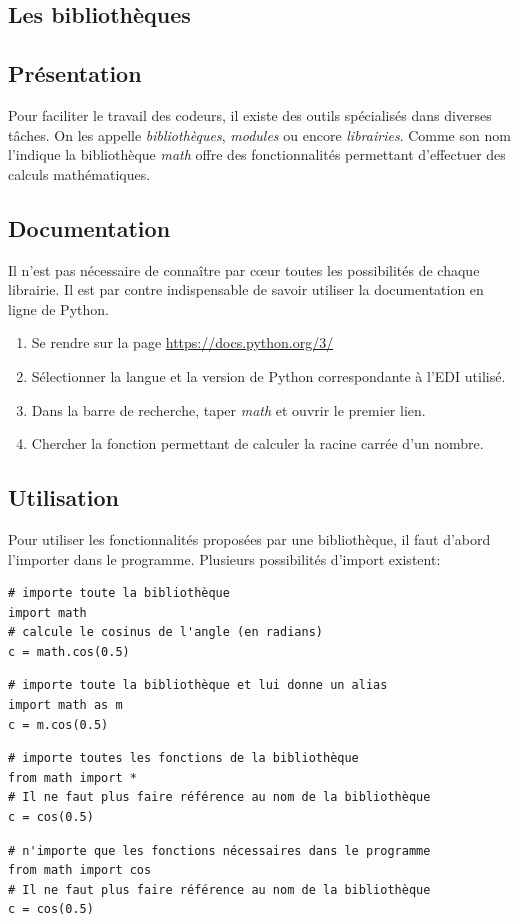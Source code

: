 \documentclass[a4paper,11pt]{article}
\begin{document}
\begin{Form}
\section{Les bibliothèques}
\subsection{Présentation}
Pour faciliter le travail des codeurs, il existe des outils spécialisés dans diverses tâches. On les appelle \emph{bibliothèques}, \emph{modules} ou encore \emph{librairies}. Comme son nom l'indique la bibliothèque \emph{math} offre des fonctionnalités permettant d'effectuer des calculs mathématiques.
\subsection{Documentation}
Il n'est pas nécessaire de connaître par cœur toutes les possibilités de chaque librairie. Il est par contre indispensable de savoir utiliser la documentation en ligne de Python.
\begin{activite}
\begin{enumerate}
\item Se rendre sur la page \url{https://docs.python.org/3/}
\item Sélectionner la langue et la version de Python correspondante à l'EDI utilisé.
\item Dans la barre de recherche, taper \emph{math} et ouvrir le premier lien.
\item Chercher la fonction permettant de calculer la racine carrée d'un nombre.
\end{enumerate}
\end{activite}
\subsection{Utilisation}
Pour utiliser les fonctionnalités proposées par une bibliothèque, il faut d'abord l'importer dans le programme. Plusieurs possibilités d'import existent:
\begin{lstlisting}
# importe toute la bibliothèque
import math
# calcule le cosinus de l'angle (en radians)
c = math.cos(0.5)
\end{lstlisting}
\begin{lstlisting}
# importe toute la bibliothèque et lui donne un alias
import math as m
c = m.cos(0.5)
\end{lstlisting}
\begin{lstlisting}
# importe toutes les fonctions de la bibliothèque
from math import *
# Il ne faut plus faire référence au nom de la bibliothèque
c = cos(0.5)
\end{lstlisting}
\begin{lstlisting}
# n'importe que les fonctions nécessaires dans le programme
from math import cos
# Il ne faut plus faire référence au nom de la bibliothèque
c = cos(0.5)
\end{lstlisting}

\end{Form}
\end{document}
